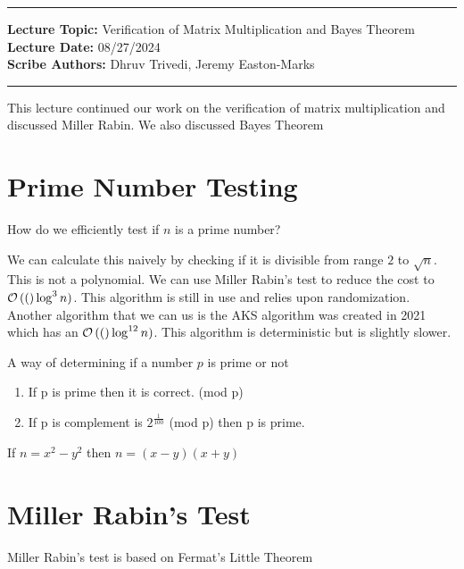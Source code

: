 \hrule
\vspace{0.1in}
\noindent
\textbf{Lecture Topic: } Verification of Matrix Multiplication and Bayes Theorem\\
\textbf{Lecture Date: }08/27/2024 \\
\textbf{Scribe Authors: }Dhruv Trivedi, Jeremy Easton-Marks
\vspace{0.1in}
\hrule
\vspace{0.1in}

This lecture continued our work on the verification of matrix multiplication and discussed Miller Rabin. We also discussed Bayes Theorem

\section*{Prime Number Testing}
How do we efficiently test if $n$ is a prime number?

We can calculate this naively by checking if it is divisible from range $2$ to $\sqrt{n}$. This is not a polynomial. We can use Miller Rabin's test to reduce the cost to $\mathcal{O}\left((\right)\log^3n)$. This algorithm is still in use and relies upon randomization. \\

Another algorithm that we can us is the AKS algorithm was created in 2021 which has an $\mathcal{O}\left((\right)\log^{12}n)$. This algorithm is deterministic but is slightly slower.

\begin{theorem}
A way of determining if a number $p$ is prime or not

\begin{enumerate}
\item If p is prime then it is correct. (mod p)
\item If p is complement is $2^{\frac{1}{100}}$ (mod p) then p is prime.
\end{enumerate}

\end{theorem}

\begin{theorem}
If $n=x^2 - y^2$ then $n=(x-y)(x+y)$

\end{theorem}

\section*{Miller Rabin's Test}
Miller Rabin's test is based on Fermat's Little Theorem


